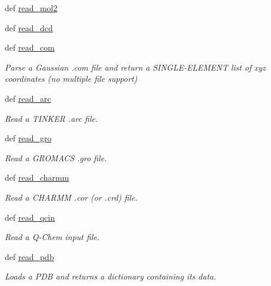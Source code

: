 \begin{DoxyCompactItemize}
def \hyperlink{classforcebalance_1_1molecule_1_1Molecule_a14b1fbc70a083d21fd016b5dd854fd56}{read\-\_\-mol2}
\item 
def \hyperlink{classforcebalance_1_1molecule_1_1Molecule_ad8fa6cc7424aae00ee3f5bb87d28e037}{read\-\_\-dcd}
\item 
def \hyperlink{classforcebalance_1_1molecule_1_1Molecule_a861feda06e1f60ab25c45eaaaf228cfc}{read\-\_\-com}
\begin{DoxyCompactList}\small\item\em \-Parse a \-Gaussian .com file and return a \-S\-I\-N\-G\-L\-E-\/\-E\-L\-E\-M\-E\-N\-T list of xyz coordinates (no multiple file support) \end{DoxyCompactList}\item 
def \hyperlink{classforcebalance_1_1molecule_1_1Molecule_aeb5983ae61079198f077f55e448e2c32}{read\-\_\-arc}
\begin{DoxyCompactList}\small\item\em \-Read a \-T\-I\-N\-K\-E\-R .arc file. \end{DoxyCompactList}\item 
def \hyperlink{classforcebalance_1_1molecule_1_1Molecule_a963a4382dc59ebd8dd9ee2064843e355}{read\-\_\-gro}
\begin{DoxyCompactList}\small\item\em \-Read a \-G\-R\-O\-M\-A\-C\-S .gro file. \end{DoxyCompactList}\item 
def \hyperlink{classforcebalance_1_1molecule_1_1Molecule_a8b8d3444945cab760288f28996787855}{read\-\_\-charmm}
\begin{DoxyCompactList}\small\item\em \-Read a \-C\-H\-A\-R\-M\-M .cor (or .crd) file. \end{DoxyCompactList}\item 
def \hyperlink{classforcebalance_1_1molecule_1_1Molecule_a003b182b54de4473c4691ae1474b1ada}{read\-\_\-qcin}
\begin{DoxyCompactList}\small\item\em \-Read a \-Q-\/\-Chem input file. \end{DoxyCompactList}\item 
def \hyperlink{classforcebalance_1_1molecule_1_1Molecule_afadc87c0cc32dc73558cd901a4c64dd4}{read\-\_\-pdb}
\begin{DoxyCompactList}\small\item\em \-Loads a \-P\-D\-B and returns a dictionary containing its data. \end{DoxyCompactList}\item 

\end{DoxyCompactItemize}
